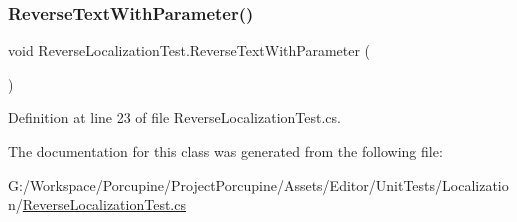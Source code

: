 \subsubsection{\texorpdfstring{Reverse\+Text\+With\+Parameter()}{ReverseTextWithParameter()}}
{\footnotesize\ttfamily void Reverse\+Localization\+Test.\+Reverse\+Text\+With\+Parameter (\begin{DoxyParamCaption}{ }\end{DoxyParamCaption})}



Definition at line 23 of file Reverse\+Localization\+Test.\+cs.



The documentation for this class was generated from the following file\+:\begin{DoxyCompactItemize}
\item 
G\+:/\+Workspace/\+Porcupine/\+Project\+Porcupine/\+Assets/\+Editor/\+Unit\+Tests/\+Localization/\hyperlink{_reverse_localization_test_8cs}{Reverse\+Localization\+Test.\+cs}\end{DoxyCompactItemize}

